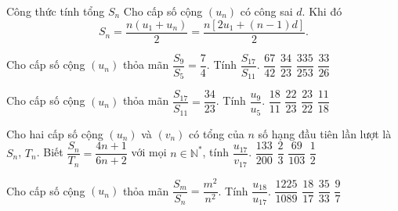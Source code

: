 \begin{dang}{Công thức tính tổng $S_n$}
Cho cấp số cộng $(u_n)$ có công sai $d$. Khi đó
\[S_n=\dfrac{n\left(u_1+u_n\right)}{2}=\dfrac{n\left[2u_1+(n-1)d\right]}{2}.\]
\end{dang}

\begin{vd}%
Cho cấp số cộng $(u_n)$ thỏa mãn $\dfrac{S_9}{S_5}=\dfrac{7}{4}$. Tính $\dfrac{S_{17}}{S_{11}}$.
\choice
{$\dfrac{67}{42}$}
{\True $\dfrac{34}{23}$}
{$\dfrac{335}{253}$}
{$\dfrac{33}{26}$}
\end{vd}

\begin{vd}%
Cho cấp số cộng $(u_n)$ thỏa mãn $\dfrac{S_{17}}{S_{11}}=\dfrac{34}{23}$. Tính $\dfrac{u_9}{u_5}$.
\choice
{$\dfrac{18}{11}$}
{\True $\dfrac{22}{23}$}
{$\dfrac{23}{22}$}
{$\dfrac{11}{18}$}
\end{vd}

\begin{vd}%
Cho hai cấp số cộng $(u_n)$ và $(v_n)$ có tổng của $n$ số hạng đầu tiên lần lượt là $S_n$, $T_n$. Biết $\dfrac{S_n}{T_n}=\dfrac{4n+1}{6n+2}$ với mọi $n\in\mathbb{N}^*$, tính $\dfrac{u_{17}}{v_{17}}$.
\choice
{\True $\dfrac{133}{200}$}
{$\dfrac{2}{3}$}
{$\dfrac{69}{103}$}
{$\dfrac{1}{2}$}

\end{vd}

\begin{vd}%
Cho cấp số cộng $(u_n)$ thỏa mãn $\dfrac{S_{m}}{S_{n}}=\dfrac{m^2}{n^2}$. Tính $\dfrac{u_{18}}{u_{17}}$.	
\choice
{$\dfrac{1225}{1089}$}
{$\dfrac{18}{17}$}
{\True $\dfrac{35}{33}$}
{$\dfrac{9}{7}$}
\end{vd}

